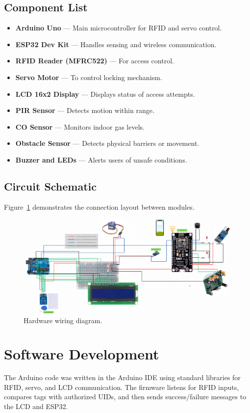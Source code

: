 \documentclass[conference, onecolumn]{IEEEtran}
\begin{document}
\subsection{Component List}
\begin{itemize}
    \item \textbf{Arduino Uno } — Main microcontroller for RFID and servo control.
    \item \textbf{ESP32 Dev Kit} — Handles sensing and wireless communication.
    \item \textbf{RFID Reader (MFRC522)} — For access control.
    \item \textbf{Servo Motor} — To control locking mechanism.
    \item \textbf{LCD 16x2 Display} — Displays status of access attempts.
    \item \textbf{PIR Sensor} — Detects motion within range.
    \item \textbf{CO Sensor} — Monitors indoor gas levels.
    \item \textbf{Obstacle Sensor} — Detects physical barriers or movement.
    \item \textbf{Buzzer and LEDs} — Alerts users of unsafe conditions.
\end{itemize}

\subsection{Circuit Schematic}
Figure~\ref{fig:circuit} demonstrates the connection layout between modules.

\begin{figure}[H]
\centering
\includegraphics[width=0.95\linewidth]{circuit.jpg}
\caption{Hardware wiring diagram.}
\label{fig:circuit}
\end{figure}

\section{Software Development}
The Arduino code was written in the Arduino IDE using standard libraries for RFID, servo, and LCD communication. The firmware listens for RFID inputs, compares tags with authorized UIDs, and then sends success/failure messages to the LCD and ESP32.
\end{document}
